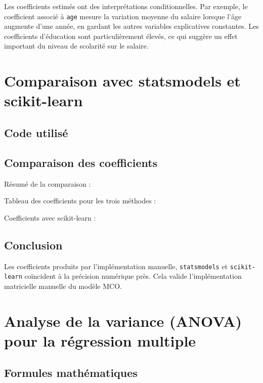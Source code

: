 \documentclass[12pt,letterpaper]{article}
\begin{document}
Les coefficients estimés ont des interprétations conditionnelles.
Par exemple, le coefficient associé à \texttt{age} mesure la variation moyenne du salaire lorsque l'âge augmente d'une année, en gardant les autres variables explicatives constantes.
Les coefficients d'éducation sont particulièrement élevés, ce qui suggère un effet important du niveau de scolarité sur le salaire.

\section{Comparaison avec statsmodels et scikit-learn}

\subsection{Code utilisé}



\subsection{Comparaison des coefficients}

Résumé de la comparaison :


Tableau des coefficients pour les trois méthodes :


Coefficients avec scikit-learn :


\subsection{Conclusion}

Les coefficients produits par l'implémentation manuelle, \texttt{statsmodels} et \texttt{scikit-learn} coïncident à la précision numérique près.
Cela valide l'implémentation matricielle manuelle du modèle MCO.

\section{Analyse de la variance (ANOVA) pour la régression multiple}

\subsection{Formules mathématiques}
\end{document}
